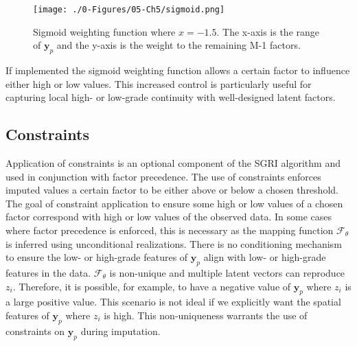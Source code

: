 \begin{figure}[htb!]
    \centering
    \texttt{[image: ./0-Figures/05-Ch5/sigmoid.png]}
    \caption{Sigmoid weighting function where $x=-1.5$. The x-axis is the range of $\mathbf{y}_{p}$ and the y-axis is the weight to the remaining M-1 factors. }
    \label{fig:sigmoid}
\end{figure}

If implemented the sigmoid weighting function allows a certain factor to influence either high or low values. This increased control is particularly useful for capturing local high- or low-grade continuity with well-designed latent factors.

\subsection{Constraints}
\label{subsec:constraints}

Application of constraints is an optional component of the \gls{SGRI} algorithm and used in conjunction with factor precedence. The use of constraints enforces imputed values a certain factor to be either above or below a chosen threshold. The goal of constraint application to ensure some high or low values of a chosen factor correspond with high or low values of the observed data. In some cases where factor precedence is enforced, this is necessary as the mapping function $\mathcal{F}_{\theta}$ is inferred using unconditional realizations. There is no conditioning mechanism to ensure the low- or high-grade features of $\mathbf{y}_{p}$ align with low- or high-grade features in the data. $\mathcal{F}_{\theta}$ is non-unique and multiple latent vectors can reproduce $z_{i}$. Therefore, it is possible, for example, to have a negative value of $\mathbf{y}_{p}$ where $z_{i}$ is a large positive value. This scenario is not ideal if we explicitly want the spatial features of $\mathbf{y}_{p}$ where $z_{i}$ is high. This non-uniqueness warrants the use of constraints on $\mathbf{y}_{p}$ during imputation.

